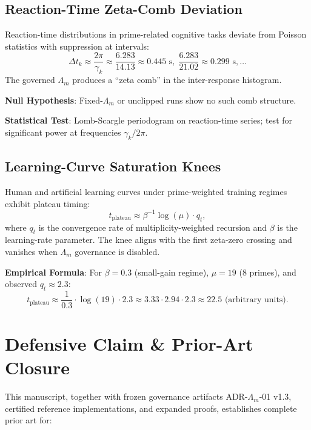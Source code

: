 \documentclass[12pt]{amsart}
\theoremstyle{plain}
\begin{document}
\subsection{Reaction-Time Zeta-Comb Deviation}

\begin{prediction}\label{pred:rt}
Reaction-time distributions in prime-related cognitive tasks deviate from Poisson statistics with suppression at intervals:
\[
\Delta t_k \approx \frac{2\pi}{\gamma_k} \approx \frac{6.283}{14.13} \approx 0.445 \text{ s}, \; \frac{6.283}{21.02} \approx 0.299 \text{ s}, \ldots
\]
The governed \(\Lambda_m\) produces a ``zeta comb'' in the inter-response histogram.
\end{prediction}

\textbf{Null Hypothesis}: Fixed-\(\Lambda_m\) or unclipped runs show no such comb structure.

\textbf{Statistical Test}: Lomb-Scargle periodogram on reaction-time series; test for significant power at frequencies \(\gamma_k/2\pi\).

\subsection{Learning-Curve Saturation Knees}

\begin{prediction}\label{pred:learning}
Human and artificial learning curves under prime-weighted training regimes exhibit plateau timing:
\[
t_{\text{plateau}} \approx \beta^{-1} \log(\mu) \cdot q_t,
\]
where \(q_t\) is the convergence rate of multiplicity-weighted recursion and \(\beta\) is the learning-rate parameter. The knee aligns with the first zeta-zero crossing and vanishes when \(\Lambda_m\) governance is disabled.
\end{prediction}

\textbf{Empirical Formula}: For \(\beta = 0.3\) (small-gain regime), \(\mu = 19\) (8 primes), and observed \(q_t \approx 2.3\):
\[
t_{\text{plateau}} \approx \frac{1}{0.3} \cdot \log(19) \cdot 2.3 \approx 3.33 \cdot 2.94 \cdot 2.3 \approx 22.5 \text{ (arbitrary units)}.
\]

\section{Defensive Claim \& Prior-Art Closure}

This manuscript, together with frozen governance artifacts ADR-\(\Lambda_m\)-01 v1.3, certified reference implementations, and expanded proofs, establishes complete prior art for:
\end{document}
